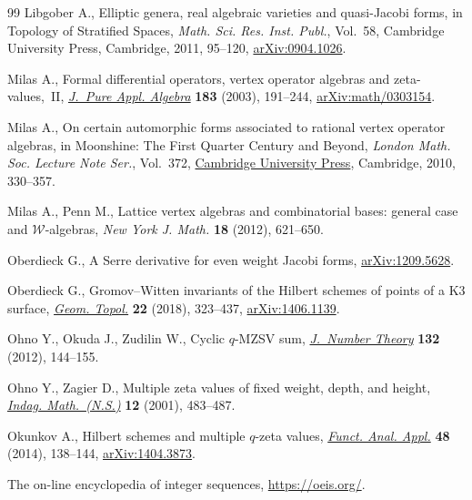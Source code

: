 \documentclass[10pt,a4paper]{amsart}
\numberwithin{equation}{section}
\theoremstyle{definition}
\begin{document}
\begin{thebibliography}{99}
Libgober A., Elliptic genera, real algebraic varieties and quasi-{J}acobi
 forms, in Topology of Stratified Spaces, \textit{Math. Sci. Res. Inst.
 Publ.}, Vol.~58, Cambridge University Press, Cambridge, 2011, 95--120,
 \href{https://arxiv.org/abs/0904.1026}{arXiv:0904.1026}.

Milas A., Formal differential operators, vertex operator algebras and
 zeta-values,~{II},
 \href{https://doi.org/10.1016/S0022-4049(03)00036-7}{\textit{J.~Pure Appl.
 Algebra}} \textbf{183} (2003), 191--244,
 \href{https://arxiv.org/abs/math/0303154}{arXiv:math/0303154}.

Milas A., On certain automorphic forms associated to rational vertex operator
 algebras, in Moonshine: The First Quarter Century and Beyond, \textit{London
 Math. Soc. Lecture Note Ser.}, Vol.~372,
 \href{https://doi.org/10.1017/CBO9780511730054.016}{Cambridge University
 Press}, Cambridge, 2010, 330--357.

Milas A., Penn M., Lattice vertex algebras and combinatorial bases: general
 case and {$\mathcal W$}-algebras, \textit{New York J. Math.} \textbf{18}
 (2012), 621--650.

Oberdieck G., A {S}erre derivative for even weight {J}acobi forms,
 \href{https://arxiv.org/abs/1209.5628}{arXiv:1209.5628}.

Oberdieck G., Gromov--{W}itten invariants of the {H}ilbert schemes of points of
 a {K}3 surface, \href{https://doi.org/10.2140/gt.2018.22.323}{\textit{Geom.
 Topol.}} \textbf{22} (2018), 323--437,
 \href{https://arxiv.org/abs/1406.1139}{arXiv:1406.1139}.

Ohno Y., Okuda J., Zudilin W., Cyclic {$q$}-{MZSV} sum,
 \href{https://doi.org/10.1016/j.jnt.2011.08.001}{\textit{J.~Number Theory}}
 \textbf{132} (2012), 144--155.

Ohno Y., Zagier D., Multiple zeta values of fixed weight, depth, and height,
 \href{https://doi.org/10.1016/S0019-3577(01)80037-9}{\textit{Indag.
 Math.~(N.S.)}} \textbf{12} (2001), 483--487.

Okunkov A., Hilbert schemes and multiple {$q$}-zeta values,
 \href{https://doi.org/10.1007/s10688-014-0054-z}{\textit{Funct. Anal. Appl.}}
 \textbf{48} (2014), 138--144,
 \href{https://arxiv.org/abs/1404.3873}{arXiv:1404.3873}.

The on-line encyclopedia of integer sequences, \url{https://oeis.org/}.


\end{thebibliography}
\end{document}
